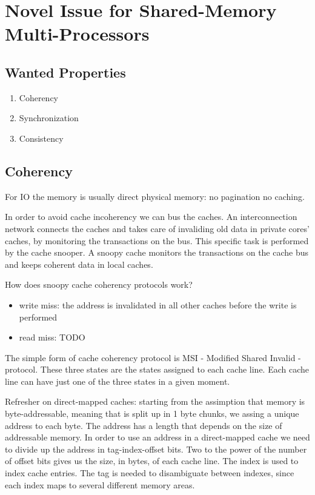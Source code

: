 \chapter{Novel Issue for Shared-Memory Multi-Processors}
\section{Wanted Properties}
\begin{enumerate}
  \item Coherency
  \item Synchronization
  \item Consistency
\end{enumerate}

\section{Coherency}
For IO the memory is usually direct physical memory: no pagination no caching.

In order to avoid cache incoherency we can bus the caches.
An interconnection network connects the caches and takes care of invaliding old data in private cores' caches, by monitoring the transactions on the bus.
This specific task is performed by the cache snooper. A snoopy cache monitors the transactions on the cache bus and keeps coherent data in local caches.

How does snoopy cache coherency protocols work?

\begin{itemize}
  \item write miss: the address is invalidated in all other caches before the write is performed
  \item read miss: TODO
\end{itemize}

The simple form of cache coherency protocol is MSI - Modified Shared Invalid - protocol.
These three states are the states assigned to each cache line. Each cache line can have just one of the three states in a given moment.

Refresher on direct-mapped caches: starting from the assimption that memory is byte-addressable, meaning that is split up in 1 byte chunks, we assing a unique address to each byte.
The address has a length that depends on the size of addressable memory. In order to use an address in a direct-mapped cache we need to divide up the address in tag-index-offset bits.
Two to the power of the number of offset bits gives us the size, in bytes, of each cache line.
The index is used to index cache entries.
The tag is needed to disambiguate between indexes, since each index maps to several different memory areas.

